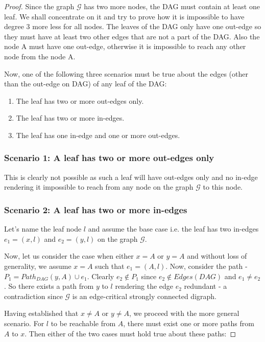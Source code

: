 \documentclass[runningheads]{llncs}
\begin{document}
\begin{proof}
Since the graph $\mathcal{G}$ has two more nodes, the DAG must contain at least one leaf. We shall concentrate on it and try to prove how it is impossible to have degree 3 more less for all nodes. The leaves of the DAG only have one out-edge so they must have at least two other edges that are not a part of the DAG. Also the node A must have one out-edge, otherwise it is impossible to reach any other node from the node A.

\vspace{0.5em} %
\noindent Now, one of the following three scenarios must be true about the edges (other than the out-edge on DAG) of any leaf of the DAG:
\begin{enumerate}
    \item The leaf has two or more out-edges only.
    \item The leaf has two or more in-edges.
    \item The leaf has one in-edge and one or more out-edges.
\end{enumerate}

\subsubsection{Scenario 1: A leaf has two or more out-edges only} This is clearly not possible as such a leaf will have out-edges only and no in-edge rendering it impossible to reach from any node on the graph $\mathcal{G}$ to this node.

\subsubsection{Scenario 2: A leaf has two or more in-edges} Let's name the leaf node $l$ and assume the base case i.e. the leaf has two in-edges $e_1 = (x, l)$ and $e_2 = (y, l)$ on the graph $\mathcal{G}$.

Now, let us consider the case when either $x = A$ or $y = A$ and without loss of generality, we assume $x = A$ such that $e_1 = (A, l)$. Now, consider the path - $P_1 = Path_{DAG}(y, A) \cup e_1$. Clearly $e_2 \notin P_1$ since $e_2 \notin Edges(DAG)$ and $e_1 \neq e_2$. So there exists a path from $y$ to $l$ rendering the edge $e_2$ redundant - a contradiction since $\mathcal{G}$ is an edge-critical strongly connected digraph.

Having established that $x \neq A$ or $y \neq A$, we proceed with the more general scenario. For $l$ to be reachable from $A$, there must exist one or more paths from $A$ to $x$. Then either of the two cases must hold true about these paths:


\end{proof}
\end{document}
